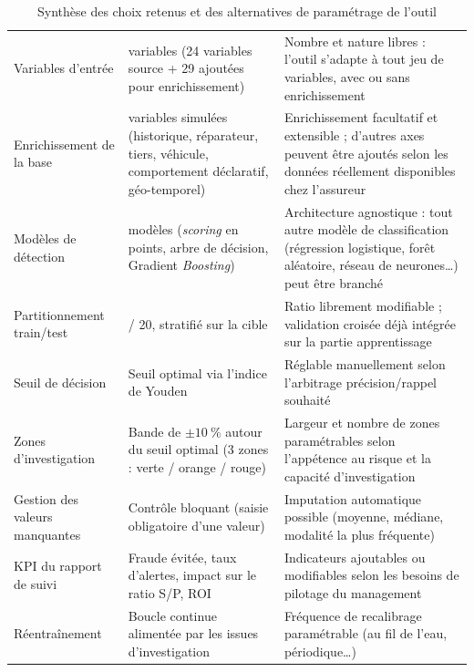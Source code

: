 \begin{table}[H]
    \centering
    \footnotesize
    \renewcommand{\arraystretch}{1.6}
    \setlength{\tabcolsep}{8pt}
    \renewcommand\tabularxcolumn[1]{m{#1}}   %
    \begin{tabularx}{\textwidth}{|>{\centering\arraybackslash}m{3.2cm}|>{\centering\arraybackslash}X|>{\centering\arraybackslash}X|}
        \hline
        \rowcolor{accenture}
        \multicolumn{1}{|c|}{\cellcolor{accenture}\textcolor{white}{\textbf{Élément de l'outil}}} & \multicolumn{1}{c|}{\cellcolor{accenture}\textcolor{white}{\textbf{Choix retenu dans ce mémoire}}} & \multicolumn{1}{c|}{\cellcolor{accenture}\textcolor{white}{\textbf{Alternatives / paramétrage possible}}} \\
        \hline
        Variables d'entrée & 53 variables (24 variables source + 29 ajoutées pour enrichissement) & Nombre et nature libres : l'outil s'adapte à tout jeu de variables, avec ou sans enrichissement \\
        \hline
        Enrichissement de la base & 29 variables simulées (historique, réparateur, tiers, véhicule, comportement déclaratif, géo-temporel) & Enrichissement facultatif et extensible ; d'autres axes peuvent être ajoutés selon les données réellement disponibles chez l'assureur \\
        \hline
        Modèles de détection & 3 modèles (\textit{scoring} en points, arbre de décision, Gradient \textit{Boosting}) & Architecture agnostique : tout autre modèle de classification (régression logistique, forêt aléatoire, réseau de neurones\ldots) peut être branché \\
        \hline
        Partitionnement train/test & 80 / 20, stratifié sur la cible & Ratio librement modifiable ; validation croisée déjà intégrée sur la partie apprentissage \\
        \hline
        Seuil de décision & Seuil optimal via l'indice de Youden & Réglable manuellement selon l'arbitrage précision/rappel souhaité \\
        \hline
        Zones d'investigation & Bande de $\pm 10~\%$ autour du seuil optimal (3 zones : verte / orange / rouge) & Largeur et nombre de zones paramétrables selon l'appétence au risque et la capacité d'investigation \\
        \hline
        Gestion des valeurs manquantes & Contrôle bloquant (saisie obligatoire d'une valeur) & Imputation automatique possible (moyenne, médiane, modalité la plus fréquente) \\
        \hline
        KPI du rapport de suivi & Fraude évitée, taux d'alertes, impact sur le ratio S/P, ROI & Indicateurs ajoutables ou modifiables selon les besoins de pilotage du management \\
        \hline
        Réentraînement & Boucle continue alimentée par les issues d'investigation & Fréquence de recalibrage paramétrable (au fil de l'eau, périodique\ldots) \\
        \hline
    \end{tabularx}
    \caption{Synthèse des choix retenus et des alternatives de paramétrage de l'outil}
    \label{tab:synthese-choix-outil}
\end{table}

